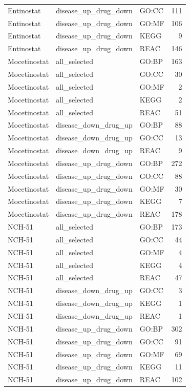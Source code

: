 \begin{longtable}{@{}lllr@{}}
Entinostat & disease\_up\_drug\_down & GO:CC & 111 \\
Entinostat & disease\_up\_drug\_down & GO:MF & 106 \\
Entinostat & disease\_up\_drug\_down & KEGG & 9 \\
Entinostat & disease\_up\_drug\_down & REAC & 146 \\
Mocetinostat & all\_selected & GO:BP & 163 \\
Mocetinostat & all\_selected & GO:CC & 30 \\
Mocetinostat & all\_selected & GO:MF & 2 \\
Mocetinostat & all\_selected & KEGG & 2 \\
Mocetinostat & all\_selected & REAC & 51 \\
Mocetinostat & disease\_down\_drug\_up & GO:BP & 88 \\
Mocetinostat & disease\_down\_drug\_up & GO:CC & 13 \\
Mocetinostat & disease\_down\_drug\_up & REAC & 9 \\
Mocetinostat & disease\_up\_drug\_down & GO:BP & 272 \\
Mocetinostat & disease\_up\_drug\_down & GO:CC & 88 \\
Mocetinostat & disease\_up\_drug\_down & GO:MF & 30 \\
Mocetinostat & disease\_up\_drug\_down & KEGG & 7 \\
Mocetinostat & disease\_up\_drug\_down & REAC & 178 \\
NCH-51 & all\_selected & GO:BP & 173 \\
NCH-51 & all\_selected & GO:CC & 44 \\
NCH-51 & all\_selected & GO:MF & 4 \\
NCH-51 & all\_selected & KEGG & 4 \\
NCH-51 & all\_selected & REAC & 47 \\
NCH-51 & disease\_down\_drug\_up & GO:CC & 3 \\
NCH-51 & disease\_down\_drug\_up & KEGG & 1 \\
NCH-51 & disease\_down\_drug\_up & REAC & 1 \\
NCH-51 & disease\_up\_drug\_down & GO:BP & 302 \\
NCH-51 & disease\_up\_drug\_down & GO:CC & 91 \\
NCH-51 & disease\_up\_drug\_down & GO:MF & 69 \\
NCH-51 & disease\_up\_drug\_down & KEGG & 11 \\
NCH-51 & disease\_up\_drug\_down & REAC & 102 \\

\end{longtable}
